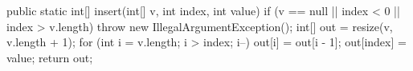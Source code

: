 \begin{unipdcode}[language=Java]
public static int[] insert(int[] v, int index, int value) {
    if (v == null || index < 0 || index > v.length)
        throw new IllegalArgumentException();
    int[] out = resize(v, v.length + 1);
    for (int i = v.length; i > index; i--)
        out[i] = out[i - 1];
    out[index] = value;
    return out;
}
\end{unipdcode}
